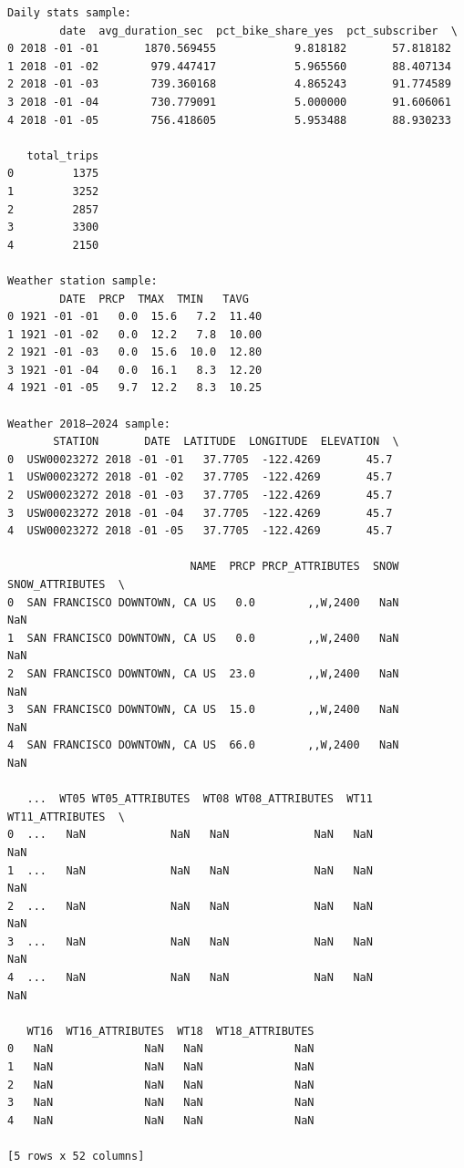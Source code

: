 \documentclass{article}
\begin{document}
\begin{verbatim}
Daily stats sample:
        date  avg_duration_sec  pct_bike_share_yes  pct_subscriber  \
0 2018 -01 -01       1870.569455            9.818182       57.818182   
1 2018 -01 -02        979.447417            5.965560       88.407134   
2 2018 -01 -03        739.360168            4.865243       91.774589   
3 2018 -01 -04        730.779091            5.000000       91.606061   
4 2018 -01 -05        756.418605            5.953488       88.930233   

   total_trips  
0         1375  
1         3252  
2         2857  
3         3300  
4         2150   

Weather station sample:
        DATE  PRCP  TMAX  TMIN   TAVG
0 1921 -01 -01   0.0  15.6   7.2  11.40
1 1921 -01 -02   0.0  12.2   7.8  10.00
2 1921 -01 -03   0.0  15.6  10.0  12.80
3 1921 -01 -04   0.0  16.1   8.3  12.20
4 1921 -01 -05   9.7  12.2   8.3  10.25 

Weather 2018–2024 sample:
       STATION       DATE  LATITUDE  LONGITUDE  ELEVATION  \
0  USW00023272 2018 -01 -01   37.7705  -122.4269       45.7   
1  USW00023272 2018 -01 -02   37.7705  -122.4269       45.7   
2  USW00023272 2018 -01 -03   37.7705  -122.4269       45.7   
3  USW00023272 2018 -01 -04   37.7705  -122.4269       45.7   
4  USW00023272 2018 -01 -05   37.7705  -122.4269       45.7   

                            NAME  PRCP PRCP_ATTRIBUTES  SNOW SNOW_ATTRIBUTES  \
0  SAN FRANCISCO DOWNTOWN, CA US   0.0        ,,W,2400   NaN             NaN   
1  SAN FRANCISCO DOWNTOWN, CA US   0.0        ,,W,2400   NaN             NaN   
2  SAN FRANCISCO DOWNTOWN, CA US  23.0        ,,W,2400   NaN             NaN   
3  SAN FRANCISCO DOWNTOWN, CA US  15.0        ,,W,2400   NaN             NaN   
4  SAN FRANCISCO DOWNTOWN, CA US  66.0        ,,W,2400   NaN             NaN   

   ...  WT05 WT05_ATTRIBUTES  WT08 WT08_ATTRIBUTES  WT11 WT11_ATTRIBUTES  \
0  ...   NaN             NaN   NaN             NaN   NaN             NaN   
1  ...   NaN             NaN   NaN             NaN   NaN             NaN   
2  ...   NaN             NaN   NaN             NaN   NaN             NaN   
3  ...   NaN             NaN   NaN             NaN   NaN             NaN   
4  ...   NaN             NaN   NaN             NaN   NaN             NaN   

   WT16  WT16_ATTRIBUTES  WT18  WT18_ATTRIBUTES  
0   NaN              NaN   NaN              NaN  
1   NaN              NaN   NaN              NaN  
2   NaN              NaN   NaN              NaN  
3   NaN              NaN   NaN              NaN  
4   NaN              NaN   NaN              NaN  

[5 rows x 52 columns]
\end{verbatim}
\end{document}
